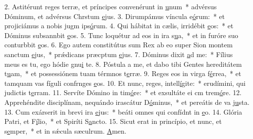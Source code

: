 2. Astitérunt reges terræ, et príncipes convenérunt in \uline{u}num~* advérsus Dóminum, et advérsus Chrstum \uline{e}jus.
3. Dirumpámus víncula e\uline{ó}rum:~* et projiciámus a nobis jugm ips\uline{ó}rum.
4. Qui hábitat in cælis, irridébit \uline{e}os:~* et Dóminus subsannbit \uline{e}os.
5. Tunc loquétur ad eos in ira s\uline{u}a,~* et in furóre suo conturbbit \uline{e}os.
6. Ego autem constitútus sum Rex ab eo super Sion montem sanctum \uline{e}jus,~* prǽdicans præcptum \uline{e}jus.
7. Dóminus dixit \uline{a}d me:~* Fílius meus es tu, ego hódie gnu\uline{i} te.
8. Póstula a me, et dabo tibi Gentes hereditátem t\uline{u}am,~* et possessiónem tuam térmnos t\uline{e}rræ.
9. Reges eos in virga f\uline{é}rrea,~* et tamquam vas fíguli confrnges \uline{e}os.
10. Et nunc, reges, intell\uline{í}gite:~* erudímini, qui judictis t\uline{e}rram.
11. Servíte Dómino in tim\uline{ó}re:~* et exsultáte ei cm trem\uline{ó}re.
12. Apprehéndite disciplínam, nequándo irascátur D\uline{ó}minus,~* et pereátis de va j\uline{u}sta.
13. Cum exárserit in brevi ira \uline{e}jus:~* beáti omnes qui confídnt in \uline{e}o.
14. Glória Patri, et F\uline{í}lio,~* et Spiríti S\uline{a}ncto.
15. Sicut erat in princípio, et nunc, et s\uline{e}mper,~* et in sǽcula sæculrum. \uline{A}men.
